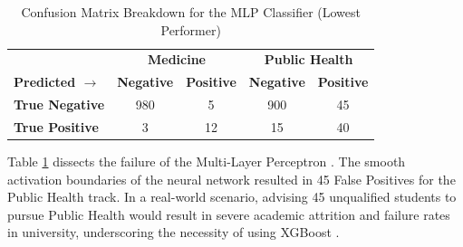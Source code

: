 \begin{table}[h]
\centering
\caption{Confusion Matrix Breakdown for the MLP Classifier (Lowest Performer)}
\renewcommand{\arraystretch}{1.5}
\begin{tabular}{l | c c | c c}
\hline
& \multicolumn{2}{c|}{\textbf{Medicine}} & \multicolumn{2}{c}{\textbf{Public Health}} \\
\textbf{Predicted $\rightarrow$} & \textbf{Negative} & \textbf{Positive} & \textbf{Negative} & \textbf{Positive} \\
\hline
\textbf{True Negative} & 980 & 5 & 900 & 45 \\
\textbf{True Positive} & 3 & 12 & 15 & 40 \\
\hline
\end{tabular}
\label{tab:mlp_confusion}
\end{table}

Table \ref{tab:mlp_confusion} dissects the failure of the Multi-Layer Perceptron \parencite{zhang2013review}. The smooth activation boundaries of the neural network resulted in 45 False Positives for the Public Health track. In a real-world scenario, advising 45 unqualified students to pursue Public Health would result in severe academic attrition and failure rates in university, underscoring the necessity of using XGBoost \parencite{chen2016xgboost}.


